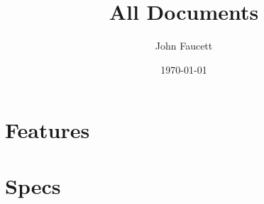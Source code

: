 \documentclass[11pt]{article}
\title{All Documents}
\author{John Faucett}
\date{\today}
\begin{document}
\maketitle

\section*{Features}


\clearpage
\section*{Specs}

\end{document}

